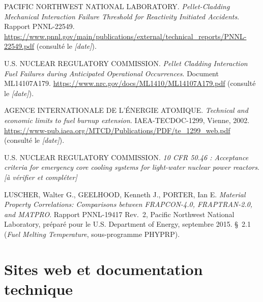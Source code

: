 \documentclass[12pt,a4paper,french]{report}
\begin{document}
\begin{list}{}{\setlength{\leftmargin}{1cm}\setlength{\itemindent}{-1cm}}

\item[{[7]}]
PACIFIC NORTHWEST NATIONAL LABORATORY.
\textit{Pellet-Cladding Mechanical Interaction Failure Threshold for Reactivity
Initiated Accidents}. Rapport PNNL-22549.
\url{https://www.pnnl.gov/main/publications/external/technical_reports/PNNL-22549.pdf}
(consulté le \textit{[date]}).

\item[{[8]}]
U.S. NUCLEAR REGULATORY COMMISSION.
\textit{Pellet Cladding Interaction Fuel Failures during Anticipated
Operational Occurrences}. Document ML14107A179.
\url{https://www.nrc.gov/docs/ML1410/ML14107A179.pdf}
(consulté le \textit{[date]}).

\item[{[9]}]
AGENCE INTERNATIONALE DE L'ÉNERGIE ATOMIQUE.
\textit{Technical and economic limits to fuel burnup extension}.
IAEA-TECDOC-1299, Vienne, 2002.
\url{https://www-pub.iaea.org/MTCD/Publications/PDF/te_1299_web.pdf}
(consulté le \textit{[date]}).

\item[{[10]}]
U.S. NUCLEAR REGULATORY COMMISSION. \textit{10 CFR 50.46 : Acceptance criteria
for emergency core cooling systems for light-water nuclear power reactors}.
\textit{\color{red}[à vérifier et compléter]}

\item[{[11]}]
LUSCHER, Walter G., GEELHOOD, Kenneth J., PORTER, Ian E.
\textit{Material Property Correlations: Comparisons between FRAPCON-4.0,
FRAPTRAN-2.0, and MATPRO}. Rapport PNNL-19417 Rev.~2, Pacific Northwest
National Laboratory, préparé pour le U.S. Department of Energy, septembre 2015.
\S~2.1 (\textit{Fuel Melting Temperature}, sous-programme PHYPRP).

\end{list}

\section*{Sites web et documentation technique}
\end{document}
